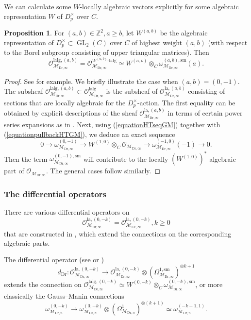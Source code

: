 \documentclass{article}
\theoremstyle{definition}
\newtheorem{proposition}[theorem]{Proposition}
\def\calM{\mathcal{M}}
\def\calO{\mathcal{O}}
\def\bbZ{\mathbb{Z}}
\DeclareMathOperator{\GL}{GL}
\def\LT{\mathrm{LT}}
\def\lan{\mathrm{la}}
\def\sm{\mathrm{sm}}
\def\lalg{\mathrm{lalg}}
\def\-{\text{-}}
\def\-{\text{-}}
\def\Dr{\mathrm{Dr}}
\begin{document}
We can calculate some $W$-locally algebraic vectors explicitly for some algebraic representation $W$ of $D_p^\times$ over $C$.
\begin{proposition}\label{prop:Wlalg}
For $(a,b)\in\bbZ^2,a\geq b$, let $W^{(a,b)}$ be the algebraic representation of $D_p^{\times}\subset \GL_2(C)$ over $C$ of highest weight $(a,b)$ (with respect to the Borel subgroup consisting of upper triangular matrices). Then 
\[\calO_{\calM_{\Dr,\infty}}^{\lalg,(a,b)}=\calO_{\calM_{\Dr,\infty}}^{W^{(a,b)}\-\lalg}\simeq W^{(a,b)}\otimes_C \omega_{\calM_{\Dr,\infty}}^{(a,b),\sm}(a).\]
\begin{proof}
See \cite[\S 3.4]{QS24} for example. We briefly illustrate the case when $(a,b)=(0,-1)$. The subsheaf $\calO_{\calM_{\Dr,\infty}}^{\lalg,(a,b)}\subset \calO_{\calM_{\Dr,\infty}}^{\lalg}$ is the subsheaf of $\calO_{\calM_{\Dr,\infty}}^{\lan,(a,b)}$ consisting of sections that are locally algebraic for the $D_p^\times$-action.  The first equality can be obtained by explicit descriptions of the sheaf $\calO_{\calM_{\Dr,\infty}}^{\lan,(a,b)}$ in terms of certain power series expansions as in \cite[Theorem 3.2.2]{PanII}. Next, using (\ref{equationHTseqGM}) together with (\ref{equationpullbackHTGM}), we deduce an exact sequence 
\[
    0\to \omega_{\calM_{\Dr,\infty}}^{(0,-1)}\to W^{(1,0)}\otimes_C \calO_{\calM_{\Dr,\infty}}\to \omega_{\calM_{\Dr,\infty}}^{(-1,0)}(-1)\to 0.
\]
Then the term $\omega_{\calM_{\Dr,\infty}}^{(0,-1),\sm}$ will contribute to the locally $(W^{(1,0)})^*$-algebraic part of $\calO_{\calM_{\Dr,\infty}}$. The general cases follow similarly.
\end{proof}
\end{proposition}

\subsubsection{The differential operators}\label{sec:differentialoperators}
There are various differential operators on 
\[\calO_{\calM_{\Dr,\infty}}^{\lan,(0,-k)}=\calO_{\calM_{\LT,\infty}}^{\lan,(0,-k)}, k\geq 0\] 
that are constructed in \cite[\S 4]{PanII}, which extend the connections on the corresponding algebraic parts.

The differential operator (see \cite[Remark 5.3.18]{PanII} or \cite[Proposition 4.3.10]{QS24})
\[d_{\Dr}:\calO_{\calM_{\Dr,\infty}}^{\lan,(0,-k)}\rightarrow \calO_{\calM_{\Dr,\infty}}^{\lan,(0,-k)}\otimes (\Omega^{1,\sm}_{\calM_{\Dr,\infty}})^{\otimes k+1}\] 
extends the connection on $\calO_{\calM_{\Dr,\infty}}^{\lalg,(0,-k)}\simeq W^{(0,-k)}\otimes_C \omega_{\calM_{\Dr,\infty}}^{(0,-k),\sm}$, or more classically the Gauss--Manin connections  
\begin{equation}\label{equationGMconnectionDr}
    \omega_{\calM_{\Dr,n}}^{(0,-k)}\rightarrow \omega_{\calM_{\Dr,n}}^{(0,-k)}\otimes (\Omega_{\calM_{\Dr,n}}^{1})^{\otimes(k+1)}\simeq \omega_{\calM_{\Dr,n}}^{(-k-1,1)}.    
\end{equation}
\end{document}
